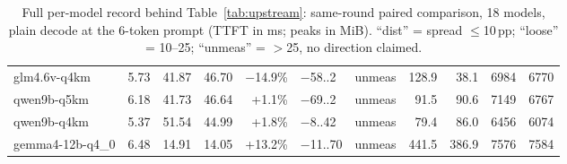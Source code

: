 \documentclass[letterpaper,twocolumn,10pt]{article}
\begin{document}
\begin{table}[t]
\begin{tabular}{@{}lrrrrlrrrrr@{}}
glm4.6v-q4km & 5.73 & 41.87 & 46.70 & $-$14.9\% & $-$58..2 & unmeas & 128.9 & 38.1 & 6984 & 6770 \\
qwen9b-q5km & 6.18 & 41.73 & 46.64 & +1.1\% & $-$69..2 & unmeas & 91.5 & 90.6 & 7149 & 6767 \\
qwen9b-q4km & 5.37 & 51.54 & 44.99 & +1.8\% & $-$8..42 & unmeas & 79.4 & 86.0 & 6456 & 6074 \\
gemma4-12b-q4\_0 & 6.48 & 14.91 & 14.05 & +13.2\% & $-$11..70 & unmeas & 441.5 & 386.9 & 7576 & 7584 \\
\bottomrule
\end{tabular}
\caption{Full per-model record behind Table~\ref{tab:upstream}: same-round
paired comparison, 18 models, plain decode at the 6-token prompt (TTFT in ms;
peaks in MiB). ``dist'' = spread $\le$10\,pp; ``loose'' = 10--25; ``unmeas'' =
$>$25, no direction claimed.}
\label{tab:upstreamfull}
\end{table}

\clearpage


\end{document}
